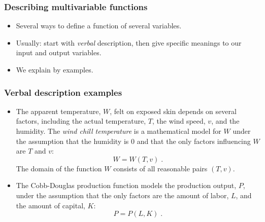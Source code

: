 \begin{frame}\frametitle{Describing multivariable functions}
\begin{itemize}
\item Several ways to define a function of several variables. 
\item Usually: start with \emph{verbal} description, then give specific meanings
to our input and output variables. 
\item We explain by examples.
\end{itemize}
\end{frame}

\begin{frame}\frametitle{Verbal description examples}
\begin{itemize}
  \item The apparent temperature, $W$, felt on exposed skin
  depends on several factors, including the actual
  temperature, $T$, the wind speed, $v$, and the humidity.
  The \emph{wind chill temperature} is a mathematical model
  for $W$ under the assumption that the humidity is 0 and
  that the only factors influencing $W$ are $T$ and $v$:
  $$W = W(T,v)\; .$$
  The domain of the function $W$ consists of all reasonable
  pairs $(T,v)$.

  \item The Cobb-Douglas production function models the
  production output, $P$, under the assumption that the
  only factors are the amount of labor, $L$, and the
  amount of capital, $K$:
  $$P=P(L,K) \; .$$
\end{itemize}

\vskip 8cm %
\end{frame}
